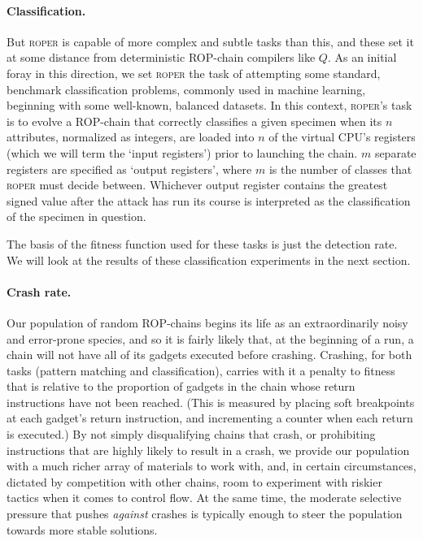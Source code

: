 \paragraph{Classification.} But \textsc{roper} is capable of
more complex and subtle tasks than this, and these set it at some
distance from deterministic ROP-chain compilers like
$Q$. As an initial foray in this direction, we set \textsc{roper}
the task of attempting some standard, benchmark classification
problems, commonly used in machine learning, beginning with some
well-known, balanced datasets. In this context, \textsc{roper}'s
task is to evolve a ROP-chain that correctly classifies
a given specimen when its $n$ attributes, normalized as integers,
are loaded into $n$ of the virtual CPU's registers
(which we will term the `input registers') prior to launching the
chain. $m$ separate registers are specified as `output
registers', where $m$ is the number of classes that
\textsc{roper} must decide between. Whichever output register
contains the greatest signed value after the attack has run its
course is interpreted as the classification of the specimen in
question. 

The basis of the fitness function used for these tasks
is just the detection rate. %
We will look at the results of these classification experiments
in the next section. 

\paragraph{Crash rate.} Our population of random
ROP-chains begins its life as an extraordinarily noisy
and error-prone species, and so it is fairly likely that, at the
beginning of a run, a chain will not have all of its gadgets
executed before crashing. Crashing,
for both tasks (pattern matching and classification),
carries with it a penalty to fitness that is relative to the
proportion of gadgets in the chain whose return instructions have
not been reached. (This is measured by placing soft breakpoints at
each gadget's return instruction, and incrementing a counter when
each return is executed.) By not simply disqualifying chains that
crash, or prohibiting instructions that are highly likely to
result in a crash, we provide our population with a much richer
array of materials to work with, and, in certain circumstances,
dictated by competition with other chains, room to experiment
with riskier tactics when it comes to control flow. At the same
time, the moderate selective pressure that pushes \emph{against}
crashes is typically enough to steer the population towards
more stable solutions. 

